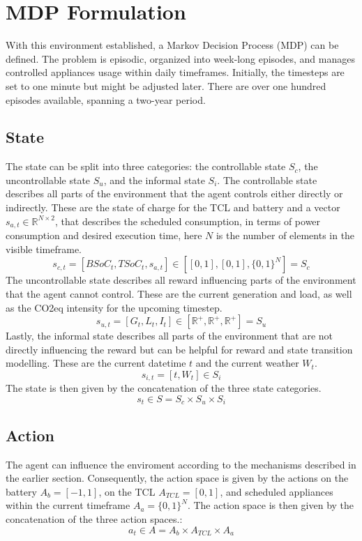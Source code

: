 \documentclass{article}
\theoremstyle{plain}
\theoremstyle{definition}
\theoremstyle{remark}
\begin{document}
\section{MDP Formulation}
With this environment established, a Markov Decision Process (MDP) can be defined. The problem is episodic, organized into week-long episodes, and manages controlled appliances usage within daily timeframes. Initially, the timesteps are set to one minute but might be adjusted later. There are over one hundred episodes available, spanning a two-year period.

\subsection{State}
The state can be split into three categories: the controllable state $S_c$, the uncontrollable state $S_u$, and the informal state $S_i$. The controllable state describes all parts of the environment that the agent controls either directly or indirectly. These are the state of charge for the TCL and battery and a vector $s_{a,t} \in \mathbb{R}^{N \times 2}$, that describes the scheduled consumption, in terms of power consumption and desired execution time, here $N$ is the number of elements in the visible timeframe.
\begin{equation}
    s_{c, t} = [BSoC_t, TSoC_t, s_{a,t}] \in  [[0,1],[0,1],\{0,1\}^N]= S_c
\end{equation}   
The uncontrollable state describes all reward influencing parts of the environment that the agent cannot control. These are the current generation and load, as well as the CO2eq intensity for the upcoming timestep.
\begin{equation}
    s_{u, t} = [G_t, L_t, I_t] \in [\mathbb{R}^+, \mathbb{R}^+, \mathbb{R}^+]= S_u
\end{equation}
Lastly, the informal state describes all parts of the environment that are not directly influencing the reward but can be helpful for reward and state transition modelling. These are the current datetime $t$ and the current weather $W_t$.
\begin{equation}
    s_{i,t} = [t, W_t] \in S_i
\end{equation}
The state is then given by the concatenation of the three state categories.
\begin{equation}
    s_t \in S = S_c \times S_u \times S_i
\end{equation}

\subsection{Action}
The agent can influence the enviroment according to the mechanisms described in the earlier section. Consequently, the action space is given by the actions on the battery $A_b = [-1, 1]$, on the TCL $A_{TCL} = [0, 1]$, and scheduled appliances within the current timeframe $A_a = \{0, 1\}^N$. The action space is then given by the concatenation of the three action spaces.:
    \begin{equation}
        a_t \in A = A_b \times A_{TCL} \times A_a
    \end{equation}
\end{document}
